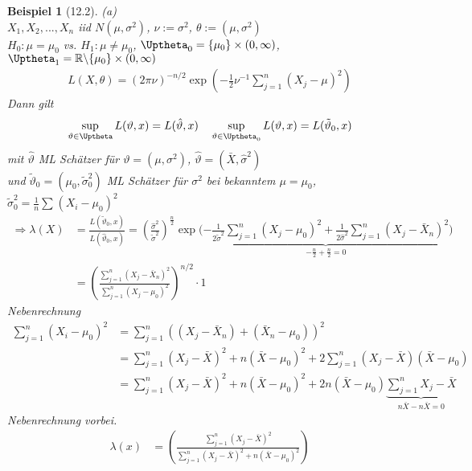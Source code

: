\documentclass[a4paper,openany]{book}
\theoremstyle{mytheoremstyle}
\newtheorem*{bei}{Beispiel}
\theoremstyle{mytheoremstyle2}
\begin{document}
\begin{bei}[12.2]
  (a) \\
  $X_1,X_2,...,X_n $ iid $N(\mu ,\sigma ^2)$, $\nu :=\sigma ^2$, $\theta :=(\mu ,\sigma ^2)$   \\
  $H_0:\mu =\mu _0$ vs. $H_1:\mu \neq \mu _0$, $\Uptheta_0=\{\mu _0\}\times (0,\infty )$, $\Uptheta_1=\mathbb{R}\backslash\{\mu _0\}\times (0,\infty ) $
  \begin{align*}
    L(X,\theta )=(2 \pi \nu )^{-n/2}\exp \left(-\frac{1}{2}\nu ^{-1}\sum_{j=1}^{n}{(X_j-\mu )^2}\right)
  \end{align*}
  Dann gilt 
  \begin{align*}
    \sup _{\vartheta \in \Uptheta}L(\vartheta,x )=L(\hat{\vartheta},x )\quad \sup _{\vartheta \in \Uptheta_0}L(\vartheta ,x)=L(\tilde{\vartheta }_0,x)
  \end{align*}
  mit $\hat{\vartheta }$ ML Schätzer für $\vartheta =(\mu ,\sigma ^2)$, $\hat{\vartheta }=(\bar{X},\hat{\sigma }^2)$  \\
  und $\tilde{\vartheta}_0=(\mu _0,\tilde{\sigma }_0^2)$ ML Schätzer für $\sigma ^2$ bei bekanntem $\mu =\mu _0$, $\tilde{\sigma }_0^2=\frac{1}{n}\sum_{}^{}{(X_i-\mu _0)^2}$
  \begin{align*}
    \Rightarrow \lambda (X)
    &=\frac{L(\tilde{\vartheta }_0,x)}{L(\hat{\vartheta}_0 ,x)}=\left(\frac{\hat{\sigma }^2}{\tilde{\sigma }^2}\right)^{\frac{n}{2}}\exp \bigg(\underbrace{-\frac{1}{2 \tilde{\sigma }^2}\sum_{j=1}^{n}{(X_j-\mu _0)^2}+\frac{1}{2 \hat{\sigma }^2}\sum_{j=1}^{n}{(X_j-\bar{X}_n)^2}}_{-\frac{n}{2}+\frac{n}{2}=0}\bigg)\\
    &=\left(\frac{\sum_{j=1}^{n}{(X_j-\bar{X}_n)^2}}{\sum_{j=1}^{n}{(X_j-\mu _0)^2}}\right)^{n/2}\cdot 1
  \end{align*}
  Nebenrechnung 
  \begin{align*}
    \sum_{j=1}^{n}{(X_i-\mu _0)^2}
    &=\sum_{j=1}^{n}{((X_j-\bar{X}_n)+(\bar{X}_n-\mu _0))^2}\\
    &=\sum_{j=1}^{n}{(X_j-\bar{X})^2}+n(\bar{X}-\mu _0)^2+2 \sum_{j=1}^{n}{(X_j-\bar{X})(\bar{X}-\mu _0)}\\
    &=\sum_{j=1}^{n}{(X_j-\bar{X})^2}+n(\bar{X}-\mu _0)^2+2 n(\bar{X}-\mu _0)\underbrace{\sum_{j=1}^{n}{X_j-\bar{X}}}_{n \bar{X}-n \bar{X}=0}
  \end{align*}
  Nebenrechnung vorbei.
  \begin{align*}
    \lambda (x)&=\left(\frac{\sum_{j=1}^{n}{(X_j-\bar{X})^2}}{\sum_{j=1}^{n}{(X_j-\bar{X})^2+n(\bar{X}-\mu _0)^2}}\right)\\

\end{align*}
\end{bei}
\end{document}
